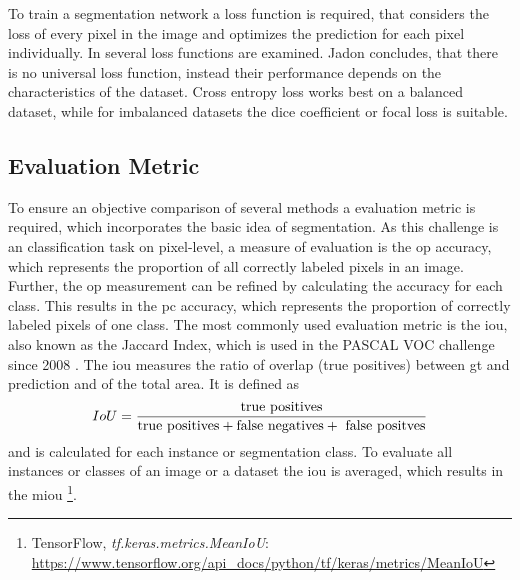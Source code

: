 To train a segmentation network a loss function is required, that considers the loss of every pixel in the image and optimizes the prediction for each pixel individually.
In \cite{Jad20-LossFunction} several loss functions are examined.
Jadon concludes, that there is no universal loss function, instead their performance depends on the characteristics of the dataset.
Cross entropy loss works best on a balanced dataset, while for imbalanced datasets the dice coefficient or focal loss is suitable.


\subsection{Evaluation Metric}\label{ord:ch2:sec2:subsec2}
To ensure an objective comparison of several methods a evaluation metric is required, which incorporates the basic idea of segmentation.
As this challenge is an classification task on pixel-level, a measure of evaluation is the \gls{op} accuracy, which represents the proportion of all correctly labeled pixels in an image.
Further, the \gls{op} measurement can be refined by calculating the accuracy for each class.
This results in the \gls{pc} accuracy, which represents the proportion of correctly labeled pixels of one class.
The most commonly used evaluation metric is the \gls{iou}, also known as the Jaccard Index, which is used in the PASCAL VOC challenge \cite{Eve20-PascalVOC} since 2008 \cite{Csu13-EvalMetric}. 
The \gls{iou} measures the ratio of overlap (true positives) between \gls{gt} and prediction and of the total area. 
It is defined as
\begin{equation} \label{equ:iou}
	\centering
	IoU = \frac{\textnormal{true positives}}{\textnormal{true positives} + \textnormal{false negatives} + \textnormal{ false positves}}
\end{equation}
and is calculated for each instance or segmentation class.
To evaluate all instances or classes of an image or a dataset the \gls{iou} is averaged, which results in the \gls{miou} 
\footnote{TensorFlow, \textit{tf.keras.metrics.MeanIoU}: \url{https://www.tensorflow.org/api_docs/python/tf/keras/metrics/MeanIoU}}.


